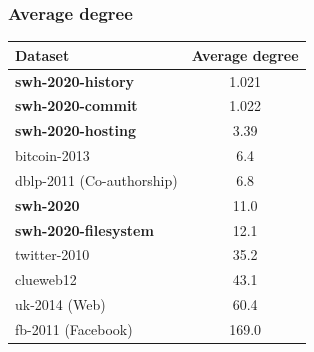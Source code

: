 \documentclass[aspectratio=169,xcolor=table]{beamer}
\begin{document}



    \begin{frame}
        \frametitle{Average degree}

        \begin{table}
            \centering
            \begin{tabular}[t]{l S[table-format=3.3]}
                \textbf{Dataset} & \textbf{Average degree} \\
                \hline
                \textbf{swh-2020-history}    & 1.021 \\
                \textbf{swh-2020-commit}     & 1.022 \\
                \textbf{swh-2020-hosting}    & 3.39 \\
                bitcoin-2013 & 6.4 \\
                dblp-2011 (Co-authorship)       & 6.8 \\
                \textbf{swh-2020}            & 11.0 \\
                \textbf{swh-2020-filesystem} & 12.1 \\
                twitter-2010      & 35.2 \\
                clueweb12                    & 43.1 \\
                uk-2014 (Web)               & 60.4 \\
                fb-2011 (Facebook)          & 169.0 \\
            \end{tabular}
        \end{table}
    \end{frame}
\end{document}
